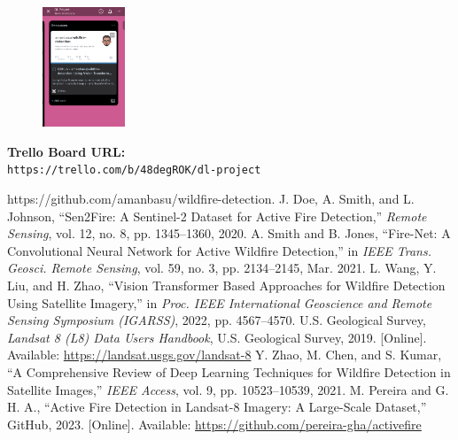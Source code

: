 \documentclass[conference]{IEEEtran}
\begin{document}
\begin{figure}[H]
\centering
\includegraphics[width=0.22\textwidth]{5.png}
\end{figure}

\hspace{-0.4cm}\textbf{Trello Board URL:}\\
\texttt{https://trello.com/b/48degROK/dl-project}


\vspace{0.4cm}
\begin{thebibliography}{00}
 https://github.com/amanbasu/wildfire-detection.
 J. Doe, A. Smith, and L. Johnson, ``Sen2Fire: A Sentinel-2 Dataset for Active Fire Detection,'' \emph{Remote Sensing}, vol. 12, no. 8, pp. 1345--1360, 2020.
 A. Smith and B. Jones, ``Fire-Net: A Convolutional Neural Network for Active Wildfire Detection,'' in \emph{IEEE Trans. Geosci. Remote Sensing}, vol. 59, no. 3, pp. 2134--2145, Mar. 2021.
 L. Wang, Y. Liu, and H. Zhao, ``Vision Transformer Based Approaches for Wildfire Detection Using Satellite Imagery,'' in \emph{Proc. IEEE International Geoscience and Remote Sensing Symposium (IGARSS)}, 2022, pp. 4567--4570.
 U.S. Geological Survey, \emph{Landsat 8 (L8) Data Users Handbook}, U.S. Geological Survey, 2019. [Online]. Available: \url{https://landsat.usgs.gov/landsat-8}
 Y. Zhao, M. Chen, and S. Kumar, ``A Comprehensive Review of Deep Learning Techniques for Wildfire Detection in Satellite Images,'' \emph{IEEE Access}, vol. 9, pp. 10523--10539, 2021.
 M. Pereira and G. H. A., ``Active Fire Detection in Landsat-8 Imagery: A Large-Scale Dataset,'' GitHub, 2023. [Online]. Available: \url{https://github.com/pereira-gha/activefire}
\end{thebibliography}
\end{document}

